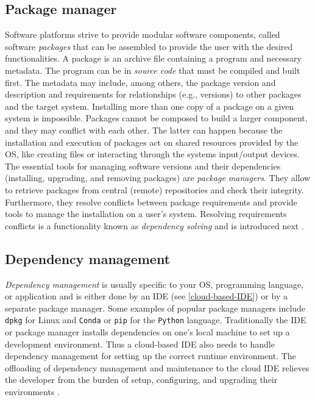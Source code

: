 \subsection{Package manager}
Software platforms strive to provide modular software components, called software \emph{packages} that can be assembled to provide the user with the desired functionalities. A package is an archive file containing a program and necessary metadata. The program can be in \emph{source code} that must be compiled and built first. The metadata may include, among others, the package version and description and requirements for relationships (e.g., versions) to other packages and the target system. Installing more than one copy of a package on a given system is impossible. Packages cannot be composed to build a larger component, and they may conflict with each other. The latter can happen because the installation and execution of packages act on shared resources provided by the OS, like creating files or interacting through the systems input/output devices. The essential tools for managing software versions and their dependencies (installing, upgrading, and removing packages) are \emph{package managers}. They allow to retrieve packages from central (remote) repositories and check their integrity. Furthermore, they resolve conflicts between package requirements and provide tools to manage the installation on a user's system. Resolving requirements conflicts is a functionality known as \emph{dependency solving} and is introduced next \cite{ABATE2013459}\cite{bedo2010}. 

\subsection{Dependency management}
\emph{Dependency management} is usually specific to your OS, programming language, or application and is either done by an IDE (see \ref{cloud-based-IDE}) or by a separate package manager. Some examples of popular package managers include \verb|dpkg| for Linux and \verb|Conda| or \verb|pip| for the \verb|Python| language. Traditionally the IDE or package manager installs dependencies on one's local machine to set up a development environment. Thus a cloud-based IDE also needs to handle dependency management for setting up the correct runtime environment. The offloading of dependency management and maintenance to the cloud IDE relieves the developer from the burden of setup, configuring, and upgrading their environments \cite{Yanagisawa6354897}. 

